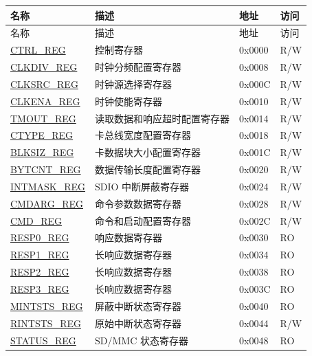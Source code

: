 \begin{longtable}{ | p{4cm} | p{7.5cm} | p{2cm} | p{1cm} | }
\hline
\rowcolor{lightgray}
名称 & 描述 &  地址 & 访问 \\\hline
        \endfirsthead
        \hline
        \rowcolor{lightgray}
名称 & 描述 &  地址 & 访问 \\\hline
        \endhead
        \endfoot
\hyperref[regdesc:CTRLREG]{CTRL\_REG} & 控制寄存器 & 0x0000 & R/W \\ \hline
\hyperref[regdesc:CLKDIVREG]{CLKDIV\_REG} & 时钟分频配置寄存器 & 0x0008 & R/W \\ \hline
\hyperref[regdesc:CLKSRCREG]{CLKSRC\_REG} & 时钟源选择寄存器 & 0x000C & R/W \\ \hline
\hyperref[regdesc:CLKENAREG]{CLKENA\_REG} & 时钟使能寄存器 & 0x0010 & R/W \\ \hline
\hyperref[regdesc:TMOUTREG]{TMOUT\_REG} & 读取数据和响应超时配置寄存器 & 0x0014 & R/W \\ \hline
\hyperref[regdesc:CTYPEREG]{CTYPE\_REG} & 卡总线宽度配置寄存器 & 0x0018 & R/W \\ \hline
\hyperref[regdesc:BLKSIZREG]{BLKSIZ\_REG} & 卡数据块大小配置寄存器 & 0x001C & R/W \\ \hline
\hyperref[regdesc:BYTCNTREG]{BYTCNT\_REG} & 数据传输长度配置寄存器 & 0x0020 & R/W \\ \hline
\hyperref[regdesc:INTMASKREG]{INTMASK\_REG} & SDIO 中断屏蔽寄存器 & 0x0024 & R/W \\ \hline
\hyperref[regdesc:CMDARGREG]{CMDARG\_REG} & 命令参数数据寄存器 & 0x0028 & R/W \\ \hline
\hyperref[regdesc:CMDREG]{CMD\_REG} & 命令和启动配置寄存器 & 0x002C & R/W \\ \hline
\hyperref[regdesc:RESP0REG]{RESP0\_REG} & 响应数据寄存器& 0x0030 & RO \\ \hline
\hyperref[regdesc:RESP1REG]{RESP1\_REG} & 长响应数据寄存器 & 0x0034 & RO \\ \hline
\hyperref[regdesc:RESP2REG]{RESP2\_REG} & 长响应数据寄存器 & 0x0038 & RO \\ \hline
\hyperref[regdesc:RESP3REG]{RESP3\_REG} & 长响应数据寄存器 & 0x003C & RO \\ \hline
\hyperref[regdesc:MINTSTSREG]{MINTSTS\_REG} & 屏蔽中断状态寄存器& 0x0040 & RO \\ \hline
\hyperref[regdesc:RINTSTSREG]{RINTSTS\_REG} & 原始中断状态寄存器 & 0x0044 & R/W \\ \hline
\hyperref[regdesc:STATUSREG]{STATUS\_REG} & SD/MMC 状态寄存器 & 0x0048 & RO \\ \hline

\end{longtable}
